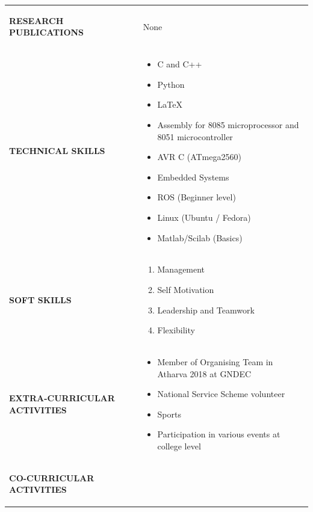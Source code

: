 \documentclass[10pt,doublespace]{article}
\begin{document}
\begin{tabular}{p{3cm}  p{10cm} }
\begin{flushleft} \textbf{RESEARCH PUBLICATIONS}\end{flushleft}&\begin{flushleft} None \end{flushleft}\\
\begin{flushleft} \textbf{TECHNICAL SKILLS}\end{flushleft}&
\begin{itemize}
\item C and C++
\item Python
\item \LaTeX
\item Assembly for 8085 microprocessor and 8051 microcontroller
\item AVR C (ATmega2560)
\item Embedded Systems
\item ROS (Beginner level)
\item Linux (Ubuntu / Fedora)
\item Matlab/Scilab (Basics)
\end{itemize}\\
\begin{flushleft} \textbf{SOFT SKILLS}\end{flushleft}&
\begin{enumerate}
\item Management
\item Self Motivation
\item Leadership and Teamwork
\item Flexibility
\end{enumerate}\\
\begin{flushleft} \textbf{EXTRA-CURRICULAR ACTIVITIES}\end{flushleft}&
\begin{itemize}
\item Member of Organising Team in Atharva 2018 at GNDEC
\item National Service Scheme volunteer
\item Sports
\item Participation in various events at college level
\end{itemize}\\
\begin{flushleft} \textbf{CO-CURRICULAR ACTIVITIES}\end{flushleft}&
\begin{enumerate}

\end{enumerate}
\end{tabular}
\end{document}
